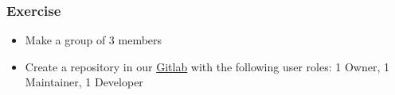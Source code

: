 \begin{frame}

\frametitle{Exercise}

\begin{itemize}[<+->]
\item Make a group of 3 members
\item Create a repository in our \href{https://gitlab.ice.csic.es}{Gitlab} with the following user roles: 1 Owner, 1 Maintainer, 1 Developer  
\end{itemize}

\end{frame}